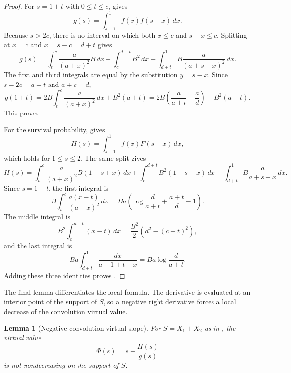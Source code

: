 \documentclass[11pt]{article}
\newtheorem{lemma}{Lemma}[section]
\begin{document}
\begin{proof}
For $s=1+t$ with $0\leq t\leq c$,  gives
\[
g(s)=\int_{s-1}^{1} f(x)f(s-x)\,dx.
\]
Because $s>2c$, there is no interval on which both $x\leq c$ and
$s-x\leq c$.  Splitting at $x=c$ and $x=s-c=d+t$ gives
\[
g(s)=
\int_t^c \frac{a}{(a+x)^2}B\,dx
+\int_c^{d+t} B^2\,dx
+\int_{d+t}^1 B\frac{a}{(a+s-x)^2}\,dx.
\]
The first and third integrals are equal by the substitution $y=s-x$.  Since
$s-2c=a+t$ and $a+c=d$,
\[
g(1+t)
=2B\int_t^c \frac{a}{(a+x)^2}\,dx+B^2(a+t)
=
2B\left(\frac{a}{a+t}-\frac{a}{d}\right)+B^2(a+t).
\]
This proves .

For the survival probability,  gives
\[
\overline H(s)=\int_{s-1}^{1} f(x)\overline F(s-x)\,dx,
\]
which holds for $1\leq s\leq 2$.  The same split gives
\[
\overline H(s)
=
\int_t^c \frac{a}{(a+x)^2}B(1-s+x)\,dx
+\int_c^{d+t} B^2(1-s+x)\,dx
+\int_{d+t}^1 B\frac{a}{a+s-x}\,dx.
\]
Since $s=1+t$, the first integral is
\[
B\int_t^c \frac{a(x-t)}{(a+x)^2}\,dx
=
Ba\left(\log\frac{d}{a+t}+\frac{a+t}{d}-1\right).
\]
The middle integral is
\[
B^2\int_c^{d+t}(x-t)\,dx
=
\frac{B^2}{2}\left(d^2-(c-t)^2\right),
\]
and the last integral is
\[
Ba\int_{d+t}^1\frac{dx}{a+1+t-x}
=
Ba\log\frac{d}{a+t}.
\]
Adding these three identities proves .
\end{proof}

The final lemma differentiates the local formula.  The derivative is evaluated
at an interior point of the support of $S$, so a negative right derivative
forces a local decrease of the convolution virtual value.

\begin{lemma}[Negative convolution virtual slope]
\label{lem:sum-has-negative-slope}
For $S=X_1+X_2$ as in , the virtual value
\begin{equation}
\label{eq:convolution-virtual-value}
\Phi(s)=s-\frac{\overline H(s)}{g(s)}
\end{equation}
is not nondecreasing on the support of $S$.
\end{lemma}
\end{document}
